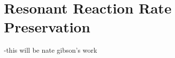 \section{Resonant Reaction Rate Preservation}
\label{sec:preservation}

-this will be nate gibson's work
